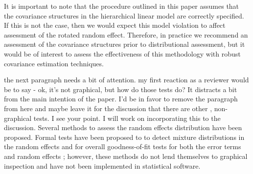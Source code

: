 \documentclass[12pt]{article} %
\newcommand{\hh}[1]{{\color{orange} #1}}
\newcommand{\al}[1]{{\color{red} #1}}
\begin{document}
It is important to note that the procedure outlined in this paper assumes that the covariance structures in the hierarchical linear model are correctly specified. If this is not the case, then we would expect this model violation to affect assessment of the rotated random effect. Therefore, in practice we recommend an assessment of the covariance structures prior to distributional assessment, but it would be of interest to assess the effectiveness of this methodology with robust covariance estimation techniques.


\hh{the next paragraph needs a bit of attention. my first reaction as a reviewer would be to say - ok, it's not graphical, but how do those tests do? It distracts a bit from the main intention of the paper. I'd be in favor to remove the paragraph from here and maybe leave it for the discussion that there are other , non-graphical tests. }
\al{I see your point. I will work on incorporating this to the discussion.}
Several methods to assess the random effects distribution have been proposed. Formal tests have been proposed to to detect mixture distributions \citep{Verbeke:1996va} in the random effects and for overall goodness-of-fit tests for both the error terms and random effects \citep{Jiang:2001up}; however, these methods do \hh{not} lend themselves to graphical inspection and have not been implemented in statistical software.



\end{document}
